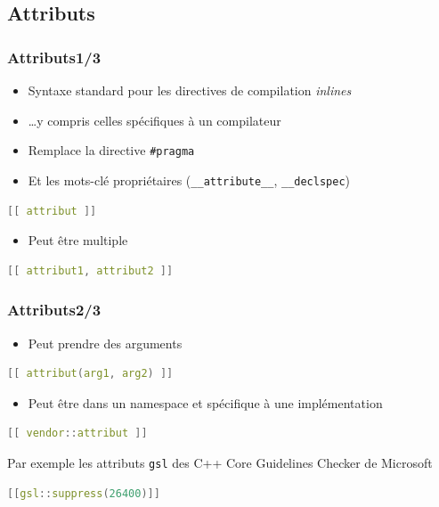 \documentclass[C++.tex]{subfiles}
\begin{document}
\subsection*{Attributs}
\begin{frame}[fragile]
	\frametitle{Attributs\titlehfill{}1/3}
	\begin{itemize}
		\item Syntaxe standard pour les directives de compilation \textit{inlines}
		\item \ldots y compris celles spécifiques à un compilateur
		\item Remplace la directive \lstinline|#pragma|
		\item Et les mots-clé propriétaires (\lstinline|__attribute__|, \lstinline|__declspec|)
	\end{itemize}

	\begin{lstlisting}[language=C++]
[[ attribut ]]\end{lstlisting}

	\begin{itemize}
		\item Peut être multiple
	\end{itemize}

	\begin{lstlisting}[language=C++]
[[ attribut1, attribut2 ]]\end{lstlisting}
\end{frame}

\begin{frame}[fragile]
	\frametitle{Attributs\titlehfill{}2/3}
	\begin{itemize}
		\item Peut prendre des arguments
	\end{itemize}

	\begin{lstlisting}[language=C++]
[[ attribut(arg1, arg2) ]]\end{lstlisting}

	\begin{itemize}
		\item Peut être dans un namespace et spécifique à une implémentation
	\end{itemize}

	\begin{lstlisting}[language=C++]
[[ vendor::attribut ]]\end{lstlisting}

	\begin{block}{Par exemple}
		les attributs \lstinline|gsl| des \og C++ Core Guidelines Checker\fg{} de Microsoft
		
	\begin{lstlisting}[language=C++]
[[gsl::suppress(26400)]]\end{lstlisting}
	\end{block}
\end{frame}
\end{document}
